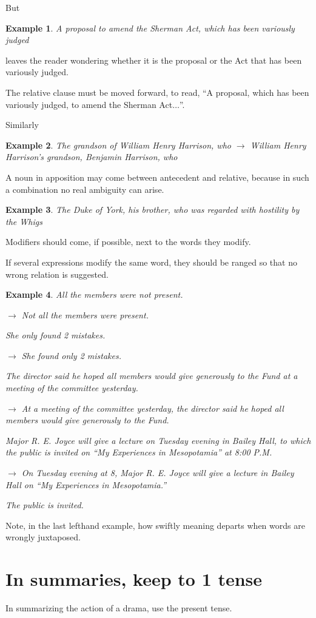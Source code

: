 \documentclass{book}
\numberwithin{equation}{section}
\newtheorem{example}{Example}[chapter]
\begin{document}
But
\begin{example}
    A proposal to amend the Sherman Act, which has been variously judged
\end{example}
leaves the reader wondering whether it is the proposal or the Act that has been variously judged.

The relative clause must be moved forward, to read, ``A proposal, which has been variously judged, to amend the Sherman Act$\ldots$''.

Similarly
\begin{example}
    The grandson of William Henry Harrison, who $\to$ William Henry Harrison's grandson, Benjamin Harrison, who
\end{example}
A noun in apposition may come between antecedent and relative, because in such a combination no real ambiguity can arise.
\begin{example}
    The Duke of York, his brother, who was regarded with hostility by the Whigs
\end{example}
Modifiers should come, if possible, next to the words they modify.

If several expressions modify the same word, they should be ranged so that no wrong relation is suggested.
\begin{example}
    All the members were not present.
    
    $\to$ Not all the members were present.
    
    She only found 2 mistakes.
    
    $\to$ She found only 2 mistakes.
    
    The director said he hoped all members would give generously to the Fund at a meeting of the committee yesterday.
    
    $\to$ At a meeting of the committee yesterday, the director said he hoped all members would give generously to the Fund.
    
    Major R. E. Joyce will give a lecture on Tuesday evening in Bailey Hall, to which the public is invited on ``My Experiences in Mesopotamia'' at 8:00 P.M.
    
    $\to$ On Tuesday evening at 8, Major R. E. Joyce will give a lecture in Bailey Hall on ``My Experiences in Mesopotamia.''
    
    The public is invited.
\end{example}
Note, in the last lefthand example, how swiftly meaning departs when words are wrongly juxtaposed.

\section{In summaries, keep to 1 tense}
In summarizing the action of a drama, use the present tense.
\end{document}
